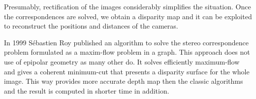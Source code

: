 Presumably, rectification of the images considerably simplifies the situation. 
Once the correspondences are solved, we obtain a disparity map and it can be exploited to reconstruct the positions and distances of the cameras.


In 1999 Sébastien Roy published an algorithm %
\cite{roy1999} to solve the stereo correspondence problem formulated as a maxim-flow problem in a graph.
This approach does not use of epipolar geometry as many other do.
It solves efficiently maximum-flow and gives a coherent minimum-cut that presents a disparity surface for the whole image.
This way provides more accurate depth map then the classic algorithms and the result is computed in shorter time in addition.



